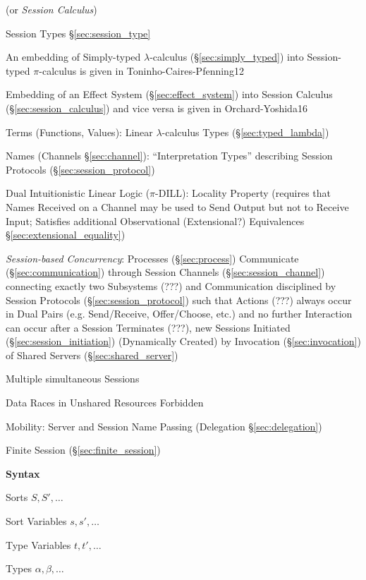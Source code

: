 (or \emph{Session Calculus})

Session Types \S\ref{sec:session_type}

\fist An embedding of Simply-typed $\lambda$-calculus
(\S\ref{sec:simply_typed}) into Session-typed $\pi$-calculus is given
in Toninho-Caires-Pfenning12 \cite{caires-pfenning-toninho12}

\fist Embedding of an Effect System (\S\ref{sec:effect_system}) into
Session Calculus (\S\ref{sec:session_calculus}) and vice versa is
given in Orchard-Yoshida16 \cite{orchard-yoshida16}

Terms (Functions, Values): Linear $\lambda$-calculus Types
(\S\ref{sec:typed_lambda})

Names (Channels \S\ref{sec:channel}): ``Interpretation Types''
describing Session Protocols (\S\ref{sec:session_protocol})

Dual Intuitionistic Linear Logic ($\pi$-DILL):
\cite{caires-pfenning10} Locality Property (requires that Names
Received on a Channel may be used to Send Output but not to Receive
Input; Satisfies additional Observational (Extensional?) Equivalences
\S\ref{sec:extensional_equality}) \cite{wadler12}

\emph{Session-based Concurrency}: Processes (\S\ref{sec:process})
Communicate (\S\ref{sec:communication}) through Session Channels
(\S\ref{sec:session_channel}) connecting exactly two Subsystems (???)
and Communication disciplined by Session Protocols
(\S\ref{sec:session_protocol}) such that Actions (???) always occur in
Dual Pairs (e.g. Send/Receive, Offer/Choose, etc.) and no further
Interaction can occur after a Session Terminates (???), new Sessions
Initiated (\S\ref{sec:session_initiation}) (Dynamically Created) by
Invocation (\S\ref{sec:invocation}) of Shared Servers
(\S\ref{sec:shared_server}) \cite{caires-pfenning10}

Multiple simultaneous Sessions

Data Races in Unshared Resources Forbidden

Mobility: Server and Session Name Passing (Delegation
\S\ref{sec:delegation})

Finite Session (\S\ref{sec:finite_session})


\textbf{Syntax}
\cite{honda-vasconcelos-kubo98}

Sorts $S, S', \ldots$

Sort Variables $s, s', \dots$

Type Variables $t, t', \ldots$

Types $\alpha, \beta, \ldots$

